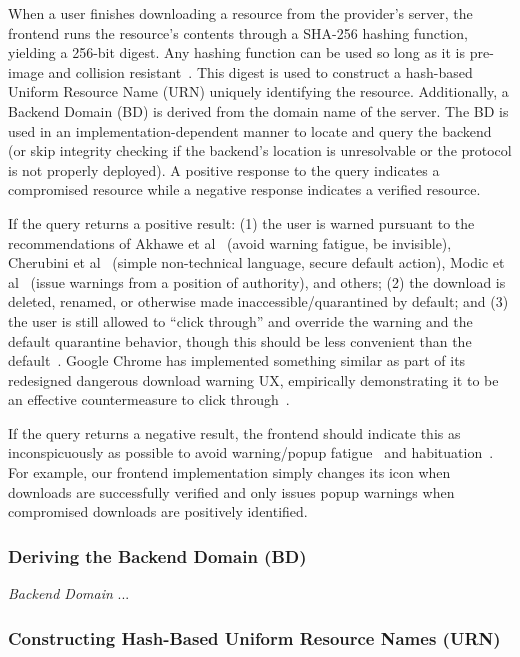 When a user finishes downloading a resource from the provider's server, the
frontend runs the resource's contents through a SHA-256 hashing function,
yielding a 256-bit digest. Any hashing function can be used so long as it is
pre-image and collision resistant~\cite{Rogaway}. This digest is used to
construct a hash-based Uniform Resource Name (URN) uniquely identifying the
resource. Additionally, a Backend Domain (BD) is derived from the domain name of
the server. The BD is used in an implementation-dependent manner to locate and
query the backend (or skip integrity checking if the backend's location is
unresolvable or the \SYSTEM{} protocol is not properly deployed). A positive
response to the query indicates a compromised resource while a negative response
indicates a verified resource.

If the query returns a positive result: (1) the user is warned pursuant to the
recommendations of Akhawe et al~\cite{Akhawe} (avoid warning fatigue, be
invisible), Cherubini et al~\cite{Cherubini} (simple non-technical language,
secure default action), Modic et al~\cite{Modic} (issue warnings from a position
of authority), and others; (2) the download is deleted, renamed, or otherwise
made inaccessible/quarantined by default; and (3) the user is still allowed to
``click through'' and override the warning and the default quarantine behavior,
though this should be less convenient than the default~\cite{Cherubini}. Google
Chrome has implemented something similar as part of its redesigned dangerous
download warning UX, empirically demonstrating it to be an effective
countermeasure to click through~\cite{ChromeClickThrough}.

If the query returns a negative result, the frontend should indicate this as
inconspicuously as possible to avoid warning/popup fatigue~\cite{Akhawe,
Cherubini} and habituation~\cite{Sunshine}. For example, our frontend
implementation simply changes its icon when downloads are successfully verified
and only issues popup warnings when compromised downloads are positively
identified.

\subsubsection{Deriving the Backend Domain (BD)}

\emph{Backend Domain} ...

\subsubsection{Constructing Hash-Based Uniform Resource Names (URN)}

